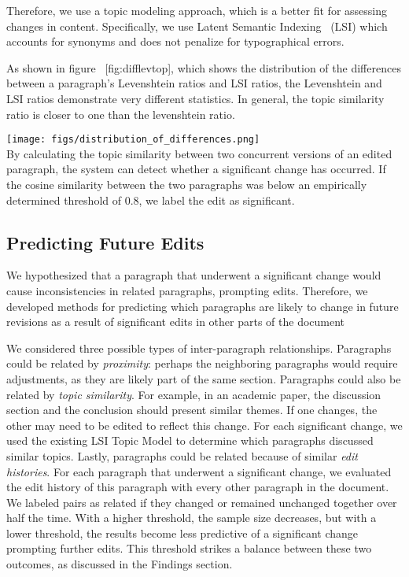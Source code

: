 Therefore, we use a topic modeling approach, which is a better fit for
assessing changes in content. Specifically, we use Latent Semantic
Indexing~\cite{deerwester1990indexing} (LSI) which accounts for synonyms
and does not penalize for typographical errors.

As shown in figure ~{[}fig:difflevtop{]}, which shows the distribution
of the differences between a paragraph's Levenshtein ratios and LSI
ratios, the Levenshtein and LSI ratios demonstrate very different
statistics. In general, the topic similarity ratio is closer to one than
the levenshtein ratio.

\texttt{[image: figs/distribution\_of\_differences.png]}\\

By calculating the topic similarity between two concurrent versions of
an edited paragraph, the system can detect whether a significant change
has occurred. If the cosine similarity between the two paragraphs was
below an empirically determined threshold of 0.8, we label the edit as
significant.

\subsection{Predicting Future Edits}\label{predicting-future-edits}

We hypothesized that a paragraph that underwent a significant change
would cause inconsistencies in related paragraphs, prompting edits.
Therefore, we developed methods for predicting which paragraphs are
likely to change in future revisions as a result of significant edits in
other parts of the document

We considered three possible types of inter-paragraph relationships.
Paragraphs could be related by \emph{proximity}: perhaps the neighboring
paragraphs would require adjustments, as they are likely part of the
same section. Paragraphs could also be related by \emph{topic
similarity}. For example, in an academic paper, the discussion section
and the conclusion should present similar themes. If one changes, the
other may need to be edited to reflect this change. For each significant
change, we used the existing LSI Topic Model to determine which
paragraphs discussed similar topics. Lastly, paragraphs could be related
because of similar \emph{edit histories}. For each paragraph that
underwent a significant change, we evaluated the edit history of this
paragraph with every other paragraph in the document. We labeled pairs
as related if they changed or remained unchanged together over half the
time. With a higher threshold, the sample size decreases, but with a
lower threshold, the results become less predictive of a significant
change prompting further edits. This threshold strikes a balance between
these two outcomes, as discussed in the Findings section.

